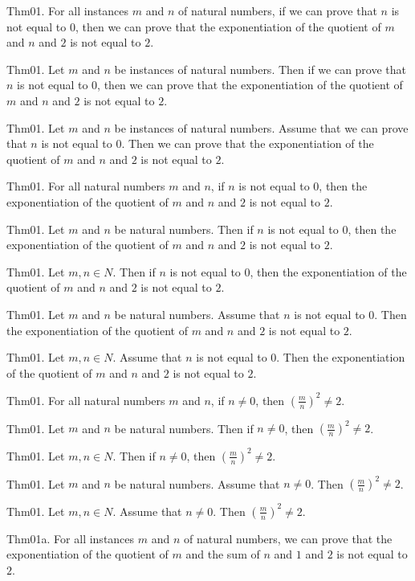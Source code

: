 \documentclass{article}
\begin{document}
Thm01. For all instances $m$ and $n$ of natural numbers, if we can prove that $n$ is not equal to $0$, then we can prove that the exponentiation of the quotient of $m$ and $n$ and $2$ is not equal to $2$.

Thm01. Let $m$ and $n$ be instances of natural numbers. Then if we can prove that $n$ is not equal to $0$, then we can prove that the exponentiation of the quotient of $m$ and $n$ and $2$ is not equal to $2$.

Thm01. Let $m$ and $n$ be instances of natural numbers. Assume that we can prove that $n$ is not equal to $0$. Then we can prove that the exponentiation of the quotient of $m$ and $n$ and $2$ is not equal to $2$.

Thm01. For all natural numbers $m$ and $n$, if $n$ is not equal to $0$, then the exponentiation of the quotient of $m$ and $n$ and $2$ is not equal to $2$.

Thm01. Let $m$ and $n$ be natural numbers. Then if $n$ is not equal to $0$, then the exponentiation of the quotient of $m$ and $n$ and $2$ is not equal to $2$.

Thm01. Let $m , n \in N$. Then if $n$ is not equal to $0$, then the exponentiation of the quotient of $m$ and $n$ and $2$ is not equal to $2$.

Thm01. Let $m$ and $n$ be natural numbers. Assume that $n$ is not equal to $0$. Then the exponentiation of the quotient of $m$ and $n$ and $2$ is not equal to $2$.

Thm01. Let $m , n \in N$. Assume that $n$ is not equal to $0$. Then the exponentiation of the quotient of $m$ and $n$ and $2$ is not equal to $2$.

Thm01. For all natural numbers $m$ and $n$, if $n \neq 0$, then ${(\frac{ m }{ n})}^{ 2}\neq 2$.

Thm01. Let $m$ and $n$ be natural numbers. Then if $n \neq 0$, then ${(\frac{ m }{ n})}^{ 2}\neq 2$.

Thm01. Let $m , n \in N$. Then if $n \neq 0$, then ${(\frac{ m }{ n})}^{ 2}\neq 2$.

Thm01. Let $m$ and $n$ be natural numbers. Assume that $n \neq 0$. Then ${(\frac{ m }{ n})}^{ 2}\neq 2$.

Thm01. Let $m , n \in N$. Assume that $n \neq 0$. Then ${(\frac{ m }{ n})}^{ 2}\neq 2$.

Thm01a. For all instances $m$ and $n$ of natural numbers, we can prove that the exponentiation of the quotient of $m$ and the sum of $n$ and $1$ and $2$ is not equal to $2$.
\end{document}
